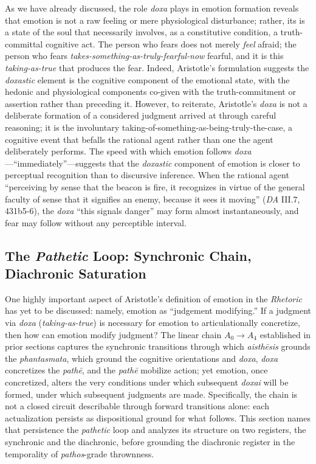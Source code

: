 As we have already discussed, the role \textit{doxa} plays in emotion formation reveals that emotion is not a raw feeling or mere physiological disturbance; rather, its is a state of the soul that necessarily involves, as a constitutive condition, a truth-committal cognitive act. The person who fears does not merely \textit{feel} afraid; the person who fears \textit{takes-something-as-truly-fearful-now} fearful, and it is this \textit{taking-as-true} that produces the fear. Indeed, Aristotle's formulation suggests the \textit{doxastic} element is the cognitive component of the emotional state, with the hedonic and physiological components co-given with the truth-commitment or assertion rather than preceding it. However, to reiterate, Aristotle's \textit{doxa} is not a deliberate formation of a considered judgment arrived at through careful reasoning; it is the involuntary taking-of-something-as-being-truly-the-case, a cognitive event that befalls the rational agent rather than one the agent deliberately performs. The speed with which emotion follows \textit{doxa}---``immediately''---suggests that the \textit{doxastic} component of emotion is closer to perceptual recognition than to discursive inference. When the rational agent ``perceiving by sense that the beacon is fire, it recognizes in virtue of the general faculty of sense that it signifies an enemy, because it sees it moving'' (\textit{DA} III.7, 431b5-6), the \textit{doxa} ``this signals danger'' may form almost instantaneously, and fear may follow without any perceptible interval. 

\subsection{The \textit{Pathetic} Loop: Synchronic Chain, Diachronic Saturation}

One highly important aspect of Aristotle's definition of emotion in the \textit{Rhetoric} has yet to be discussed: namely, emotion as ``judgement modifying.'' If a judgment via \textit{doxa} (\textit{taking-as-true}) is necessary for emotion to articulationally concretize, then how can emotion modify judgment? The linear chain $A_0 \rightarrow A_4$ established in prior sections captures the synchronic transitions through which \textit{aisthēsis} grounds the \textit{phantasmata}, which ground the cognitive orientations and \textit{doxa}, \textit{doxa} concretizes the \textit{pathē}, and the \textit{pathē} mobilize action; yet emotion, once concretized, alters the very conditions under which subsequent \textit{doxai} will be formed, under which subsequent judgments are made. Specifically, the chain is not a closed circuit describable through forward transitions alone: each actualization persists as dispositional ground for what follows. This section names that persistence the \textit{pathetic} loop and analyzes its structure on two registers, the synchronic and the diachronic, before grounding the diachronic register in the temporality of \textit{pathos}-grade thrownness.

